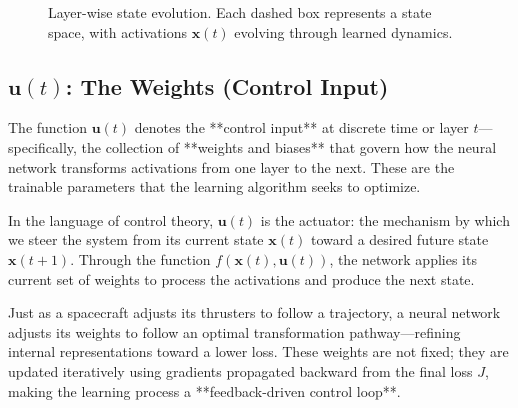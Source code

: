 \begin{figure}[H]
\caption{Layer-wise state evolution. Each dashed box represents a state space, with activations \(\mathbf{x}(t)\) evolving through learned dynamics.}
\end{figure}



\subsection{\(\mathbf{u}(t)\): The Weights (Control Input)}

The function \(\mathbf{u}(t)\) denotes the **control input** at discrete time or layer \(t\)—specifically, the collection of **weights and biases** that govern how the neural network transforms activations from one layer to the next. These are the trainable parameters that the learning algorithm seeks to optimize.

In the language of control theory, \(\mathbf{u}(t)\) is the actuator: the mechanism by which we steer the system from its current state \(\mathbf{x}(t)\) toward a desired future state \(\mathbf{x}(t+1)\). Through the function \(f(\mathbf{x}(t), \mathbf{u}(t))\), the network applies its current set of weights to process the activations and produce the next state. 

Just as a spacecraft adjusts its thrusters to follow a trajectory, a neural network adjusts its weights to follow an optimal transformation pathway—refining internal representations toward a lower loss. These weights are not fixed; they are updated iteratively using gradients propagated backward from the final loss \(J\), making the learning process a **feedback-driven control loop**.

